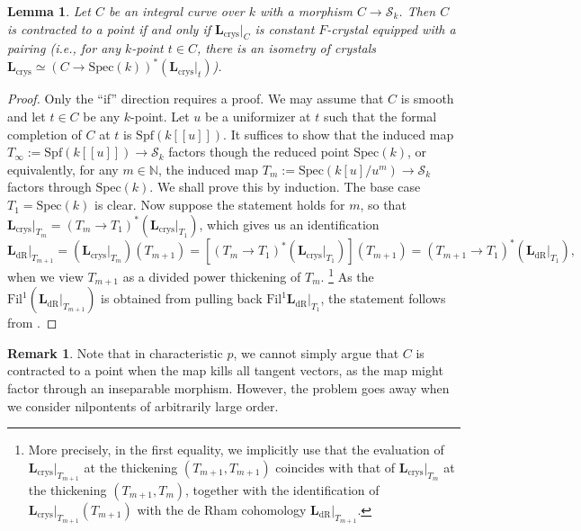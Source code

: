 \documentclass[11pt, letterpaper]{amsart}
\theoremstyle{plain}
\newtheorem{lemma}[theorem]{Lemma}
\theoremstyle{definition}
\newtheorem{remark}[theorem]{Remark}
\newcommand{\IN}{\mathbb{N}}
\newcommand{\Spec}{\mathrm{Spec}}
\newcommand{\<}{\langle}
\renewcommand{\>}{\rangle}
\newcommand{\shS}{\mathscr{S}}
\newcommand{\bL}{\mathbf{L}}
\newcommand{\crys}{\mathrm{crys}}
\newcommand{\dR}{\mathrm{dR}}
\newcommand{\Fil}{\mathrm{Fil}}
\begin{document}
\begin{lemma}
\label{lem: constant K3 crystal}
    Let $C$ be an integral curve over $k$ with a morphism $C \to \shS_k$. 
    Then $C$ is contracted to a point if and only if $\bL_\crys|_C$ is constant $F$-crystal equipped with a pairing (i.e., for any $k$-point $t \in C$, there is an isometry of crystals $\bL_\crys \simeq (C \to \Spec(k))^* (\bL_\crys|_t)$). 
\end{lemma}
\begin{proof}
    Only the ``if'' direction requires a proof. 
    We may assume that $C$ is smooth and let $t \in C$ be any $k$-point. Let $u$ be a uniformizer at $t$ such that the formal completion of $C$ at $t$ is $\mathrm{Spf}(k[\![u]\!])$. 
    It suffices to show that the induced map $T_\infty := \mathrm{Spf}(k[\![u]\!]) \to \shS_k$ factors though the reduced point $\Spec(k)$, or equivalently, for any $m \in \IN$, the induced map $T_m := \mathrm{Spec}(k[u]/u^m) \to \shS_k$ factors through $\Spec(k)$. We shall prove this by induction. The base case $T_1 = \Spec(k)$ is clear. 
    Now suppose the statement holds for $m$, so that $\bL_\crys|_{T_m} = (T_m \to T_1)^*(\bL_{\crys}|_{T_1})$, which gives us an identification $$\bL_{\dR}|_{T_{m + 1}} = (\bL_\crys|_{T_m})(T_{m + 1}) = [(T_m \to T_1)^*(\bL_{\crys}|_{T_1})](T_{m + 1}) = (T_{m + 1} \to T_1)^*(\bL_\dR|_{T_1}), $$ when we view $T_{m + 1}$ as a divided power thickening of $T_m$. 
    \footnote{More precisely, in the first equality, we implicitly use that the evaluation of $\bL_\crys|_{T_{m+1}}$ at the thickening $(T_{m+1},T_{m+1})$ coincides with that of $\bL_\crys|_{T_m}$ at the thickening $(T_{m+1},T_m)$, together with the identification of $\bL_\crys|_{T_{m+1}}(T_{m + 1})$ with the de Rham cohomology $\bL_\dR|_{T_{m + 1}}$.}
    As the $\Fil^1(\bL_{\dR}|_{T_{m + 1}})$ is obtained from pulling back $\Fil^1 \bL_\dR |_{T_1}$, the statement follows from \cite[Prop.~5.16]{CSpin}.
\end{proof}

\begin{remark}
    Note that in characteristic $p$, we cannot simply argue that $C$ is contracted to a point when the map kills all tangent vectors, as the map might factor through an inseparable morphism. However, the problem goes away when we consider nilpontents of arbitrarily large order. 
\end{remark}
\end{document}
